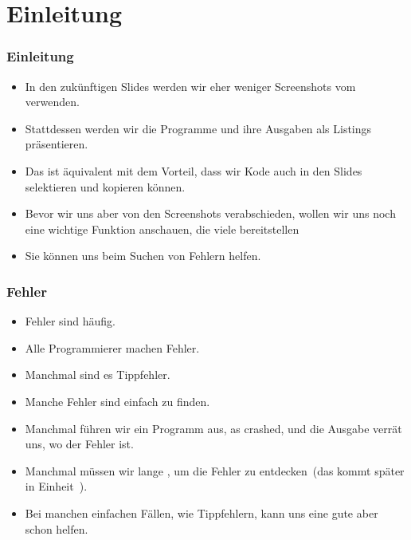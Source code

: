 \documentclass[aspectratio=169,mathserif,notheorems]{beamer}%
\subtitle{14.~Zwischenspiel:~Fehler im Kode mit Exceptions und IDE finden}%
\begin{document}
%
%
\startPresentation%
%
\section{Einleitung}%
\begin{frame}%
\frametitle{Einleitung}%
\begin{itemize}%
\item In den zukünftigen Slides werden wir eher weniger Screenshots vom \pycharm\  verwenden.%
\item<2-> Stattdessen werden wir die Programme und ihre Ausgaben als Listings präsentieren.%
\item<3-> Das ist äquivalent mit dem Vorteil, dass wir Kode auch in den Slides selektieren und kopieren können.%
\item<4-> Bevor wir uns aber von den Screenshots verabschieden, wollen wir uns noch eine wichtige Funktion anschauen, die viele  bereitstellen%
\item<5-> Sie können uns beim Suchen von Fehlern helfen.%
\end{itemize}%
\end{frame}%
%
\begin{frame}%
\frametitle{Fehler}%
\begin{itemize}%
\item Fehler sind häufig.%
\item<2-> \alert{Alle Programmierer machen Fehler.}%
\item<3-> Manchmal sind es Tippfehler.%
\item<9-> Manche Fehler sind einfach zu finden.%
\item<10-> Manchmal führen wir ein Programm aus, as crashed, und die Ausgabe verrät uns, wo der Fehler ist.
\item<11-> Manchmal müssen wir lange , um die Fehler zu entdecken~(das kommt später in Einheit~\unitDebugger).%
\item<12-> Bei manchen einfachen Fällen, wie Tippfehlern, kann uns eine gute  aber schon helfen.%
\end{itemize}%
\end{frame}%
%
\end{document}
